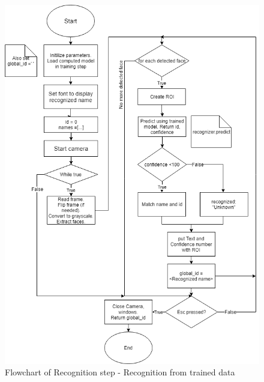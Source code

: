         \begin{figure}[!ht]
            \begin{center}
            \includegraphics[scale=0.65]{images/recognize.png}
            \caption{Flowchart of Recognition step - Recognition from trained data}
            \label{fig:recognize}
            \end{center}
        \end{figure}
        
        
        
    


        





